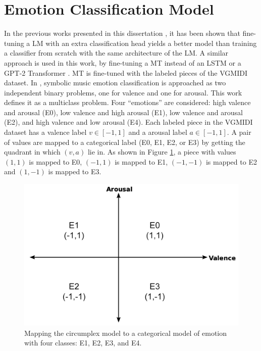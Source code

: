 
\section{Emotion Classification Model}
\label{sec:emotion_classifier}

In the previous works presented in this dissertation \cite{ferreira_2019, ferreira2020computer}, it has been shown that fine-tuning a LM with an extra classification head yields a better model than training a classifier from scratch with the same architecture of the LM. A similar approach is used in this work, by fine-tuning a MT instead of an LSTM \cite{ferreira_2019} or a GPT-2 Transformer \cite{ferreira2020computer}. MT is fine-tuned with the labeled pieces of the VGMIDI dataset. In \cite{ferreira_2019, ferreira2020computer}, symbolic music emotion classification is approached as two independent binary problems, one for valence and one for arousal. This work defines it as a multiclass problem. Four ``emotions'' are considered: high valence and arousal (E0), low valence and high arousal (E1), low valence and arousal (E2), and high valence and low arousal (E4). Each labeled piece in the VGMIDI dataset has a valence label $v \in [-1, 1]$ and a arousal label $a \in [-1, 1]$. A pair of values are mapped to a categorical label (E0, E1, E2, or E3) by getting the quadrant in which $(v,a)$ lie in. As shown in Figure \ref{fig:va_mapping}, a piece with values $(1,1)$ is mapped to E0, $(-1,1)$ is mapped to E1, $(-1,-1)$ is mapped to E2 and $(1, -1)$ is mapped to E3.

\begin{figure}
 \centering
 \includegraphics[width=0.7\columnwidth]{imgs/ismir21/circumplex.png}
 \caption{Mapping the circumplex model to a categorical model of emotion with four classes: E1, E2, E3, and E4.}
 \label{fig:va_mapping}
\end{figure}

